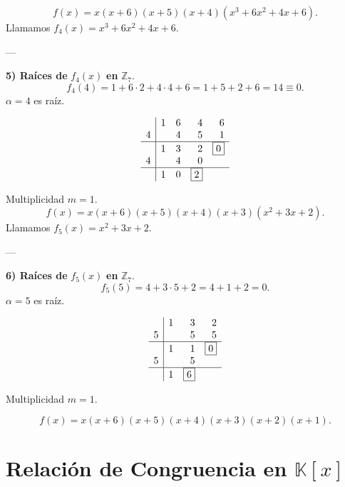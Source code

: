 \documentclass[a4paper,12pt]{article}
\begin{document}
\begin{ejercicio}[title=Ejercicio 52]

\[
f(x) = x(x+6)(x+5)(x+4)(x^3 + 6x^2 + 4x + 6).
\]
Llamamos \(f_4(x) = x^3 + 6x^2 + 4x + 6.\)

---

\textbf{5) Raíces de } \(f_4(x)\) \textbf{ en } \(\mathbb{Z}_7.\)
\[
f_4(4) = 1 + 6\cdot2 + 4\cdot4 + 6 = 1 + 5 + 2 + 6 = 14 \equiv 0.
\]
\(\alpha = 4\) es raíz.

\[
\begin{array}{r|rrrr}
  & 1 & 6 & 4 & 6 \\
4 &   & 4 & 5 & 1 \\
\hline
  & 1 & 3 & 2 & \boxed{0} \\
4 &   & 4 & 0 \\
\hline
  & 1 & 0 & \boxed{2}
\end{array}
\]

Multiplicidad \(m = 1\).  
\[
f(x) = x(x+6)(x+5)(x+4)(x+3)(x^2 + 3x + 2).
\]
Llamamos \(f_5(x) = x^2 + 3x + 2.\)

---

\textbf{6) Raíces de } \(f_5(x)\) \textbf{ en } \(\mathbb{Z}_7.\)
\[
f_5(5) = 4 + 3\cdot5 + 2 = 4 + 1 + 2 = 0.
\]
\(\alpha = 5\) es raíz.

\[
\begin{array}{r|rrr}
  & 1 & 3 & 2 \\
5 &   & 5 & 5 \\
\hline
  & 1 & 1 & \boxed{0} \\
5 &   & 5 \\
\hline
  & 1 & \boxed{6}
\end{array}
\]

Multiplicidad \(m = 1.\)

\[
\boxed{f(x) = x(x+6)(x+5)(x+4)(x+3)(x+2)(x+1).}
\]
\end{ejercicio}

\section{Relación de Congruencia en \(\mathbb{K}[x]\)}
\end{document}
